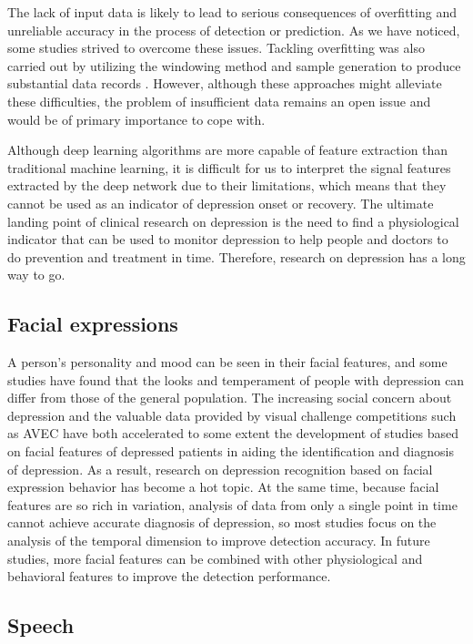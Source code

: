 The lack of input data is likely to lead to serious consequences of overfitting and unreliable accuracy in the process of detection or prediction.
As we have noticed, some studies strived to overcome these issues. Tackling overfitting was also carried out by utilizing the windowing method and sample generation to produce substantial data records \cite{sharma2021dephnn}.
However, although these approaches might alleviate these difficulties, the problem of insufficient data remains an open issue and would be of primary importance to cope with.

Although deep learning algorithms are more capable of feature extraction than traditional machine learning, it is difficult for us to interpret the signal features extracted by the deep network due to their limitations, which means that they cannot be used as an indicator of depression onset or recovery. The ultimate landing point of clinical research on depression is the need to find a physiological indicator that can be used to monitor depression to help people and doctors to do prevention and treatment in time. Therefore, research on depression has a long way to go.

\subsection{Facial expressions}
A person's personality and mood can be seen in their facial features, and some studies have found that the looks and temperament of people with depression can differ from those of the general population. The increasing social concern about depression and the valuable data provided by visual challenge competitions such as AVEC have both accelerated to some extent the development of studies based on facial features of depressed patients in aiding the identification and diagnosis of depression. As a result, research on depression recognition based on facial expression behavior has become a hot topic.
At the same time, because facial features are so rich in variation, analysis of data from only a single point in time cannot achieve accurate diagnosis of depression, so most studies focus on the analysis of the temporal dimension to improve detection accuracy.
In future studies, more facial features can be combined with other physiological and behavioral features to improve the detection performance.

\subsection{Speech}

